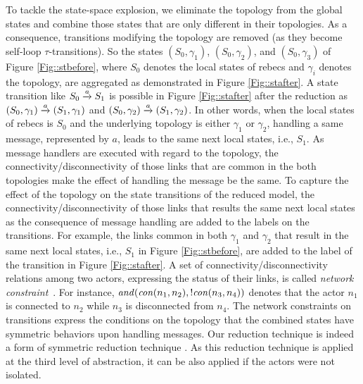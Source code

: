 To tackle the state-space explosion, we eliminate the topology from the global states and combine those states that are only different in their topologies. As a consequence, transitions modifying the topology are removed (as they become self-loop $\tau$-transitions). So the states $(S_0,\gamma_1)$, $(S_0,\gamma_2)$, and $(S_0,\gamma_3)$ of Figure \ref{Fig::stbefore}, 
where $S_0$ denotes the local states of rebecs and $\gamma_i$ denotes the  topology, are aggregated as demonstrated in Figure \ref{Fig::stafter}. %
A state transition like $S_0\overto{a} S_1$ is possible in Figure \ref{Fig::stafter} after the reduction as $(S_0,\gamma_1)\overto{a}(S_1,\gamma_1)$ and $(S_0,\gamma_2)\overto{a}(S_1,\gamma_2)$. In other words, when the local states of rebecs is $S_0$ and the underlying topology is either $\gamma_1$ or $\gamma_2$, handling a same message, represented by $a$, leads to the same next local states, i.e., $S_1$.  As message handlers are executed with regard to the topology, the connectivity/disconnectivity of those links that are common in the both topologies make the effect of handling the message be the same. To capture the effect of the topology on the state transitions of the reduced model, the connectivity/disconnectivity of those links
that results the same next local states as the consequence of message handling %
are added to the labels on the transitions. For example, %
the links common in both $\gamma_{1}$ and $\gamma_{2}$ that result in the same next local states, i.e., $S_1$ in Figure \ref{Fig::stbefore}, are added to the label of the transition in Figure \ref{Fig::stafter}. 
%
A set of connectivity/disconnectivity relations among two actors, expressing the status of their links, is called \emph{network constraint}~\cite{FatemehFI10,FatemehFI19}. For instance, ${\it and}({\it con}(n_1,n_2),!{\it con}(n_3,n_4))$ denotes that the actor  $n_1$ is connected to $n_2$ while $n_3$ is disconnected from $n_4$. The network constraints on transitions express the conditions on the topology that the combined states have symmetric behaviors upon handling messages.  Our reduction technique is indeed a form of symmetric reduction technique \cite{clarke1998symmetry}. As this reduction technique is applied at the third level of abstraction, it can be also applied if the actors were not isolated. %
